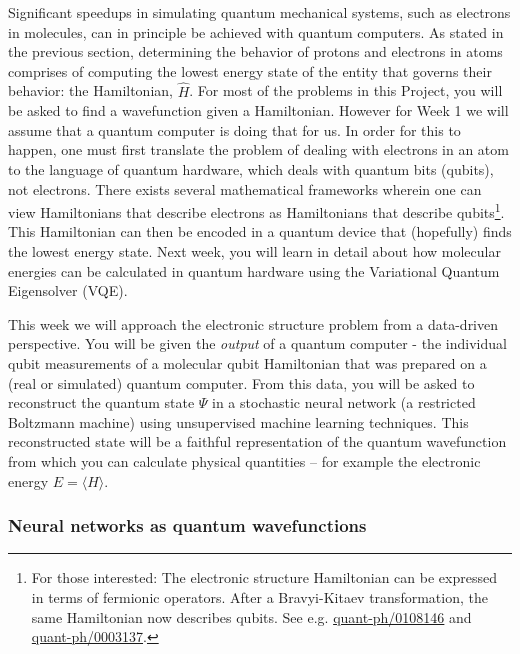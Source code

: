 \documentclass[12pt]{article}
\begin{document}
Significant speedups in simulating quantum mechanical systems, such as electrons in molecules, can in principle be achieved with quantum computers.
As stated in the previous section, determining the behavior of protons and electrons in atoms comprises of computing the lowest energy state of the entity that governs their behavior: the Hamiltonian, $\hat{H}$.
For most of the problems in this Project, you will be asked to find a wavefunction given a Hamiltonian.  However for Week 1 we will assume that a quantum
computer is doing that for us.  In order for this to happen, one must first translate the problem of dealing with electrons in an atom to
the language of quantum hardware, which deals with quantum bits (qubits), not electrons.
There exists several mathematical frameworks wherein one can view Hamiltonians that describe electrons as Hamiltonians that describe qubits\footnote{For those interested: The electronic structure Hamiltonian can be expressed in terms of fermionic operators. After a Bravyi-Kitaev transformation, the same Hamiltonian now describes qubits. See e.g. \href{https://arxiv.org/abs/quant-ph/0108146}{quant-ph/0108146} and \href{https://arxiv.org/abs/quant-ph/0003137}{quant-ph/0003137}.}.
This Hamiltonian can then be encoded in a quantum device that (hopefully) finds the lowest energy state.
Next week, you will learn in detail about how molecular energies can be calculated in quantum hardware using
the Variational Quantum Eigensolver (VQE).

This week we will approach the electronic structure problem from a data-driven perspective.
You will be given the {\it output} of a quantum computer - the individual qubit measurements of a molecular qubit Hamiltonian that was prepared
on a (real or simulated) quantum computer.
From this data, you will be asked to reconstruct the quantum state $\Psi$ in a stochastic neural network
(a restricted Boltzmann machine) using unsupervised machine learning techniques.
This reconstructed state will be a faithful representation of the quantum wavefunction from which you can calculate physical quantities -- for example the electronic energy $E = \langle H \rangle$.

\subsubsection{Neural networks as quantum wavefunctions}
\end{document}
